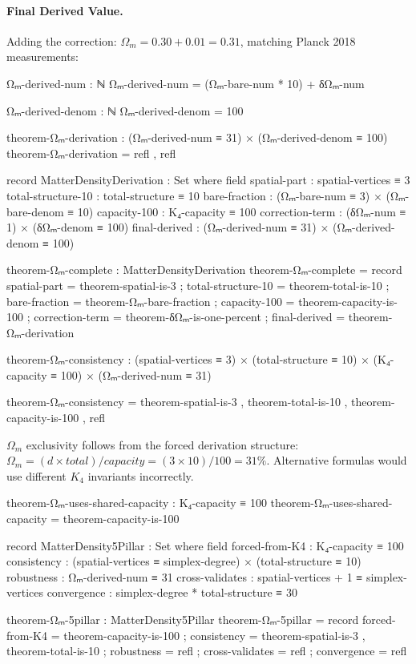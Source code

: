 \documentclass[11pt,a4paper]{book}
\def\text#1{#1}%
\begin{document}
\paragraph{Final Derived Value.}
Adding the correction: $\Omega_m = 0.30 + 0.01 = 0.31$, matching Planck 2018 measurements:

\begin{code}
Ωₘ-derived-num : ℕ
Ωₘ-derived-num = (Ωₘ-bare-num * 10) + δΩₘ-num

Ωₘ-derived-denom : ℕ
Ωₘ-derived-denom = 100

theorem-Ωₘ-derivation : (Ωₘ-derived-num ≡ 31) × (Ωₘ-derived-denom ≡ 100)
theorem-Ωₘ-derivation = refl , refl

record MatterDensityDerivation : Set where
  field
    spatial-part       : spatial-vertices ≡ 3
    total-structure-10 : total-structure ≡ 10
    bare-fraction      : (Ωₘ-bare-num ≡ 3) × (Ωₘ-bare-denom ≡ 10)
    capacity-100       : K₄-capacity ≡ 100
    correction-term    : (δΩₘ-num ≡ 1) × (δΩₘ-denom ≡ 100)
    final-derived      : (Ωₘ-derived-num ≡ 31) × (Ωₘ-derived-denom ≡ 100)

theorem-Ωₘ-complete : MatterDensityDerivation
theorem-Ωₘ-complete = record
  { spatial-part       = theorem-spatial-is-3
  ; total-structure-10 = theorem-total-is-10
  ; bare-fraction      = theorem-Ωₘ-bare-fraction
  ; capacity-100       = theorem-capacity-is-100
  ; correction-term    = theorem-δΩₘ-is-one-percent
  ; final-derived      = theorem-Ωₘ-derivation
  }
\end{code}

\begin{code}
theorem-Ωₘ-consistency : (spatial-vertices ≡ 3)
                       × (total-structure ≡ 10)
                       × (K₄-capacity ≡ 100)
                       × (Ωₘ-derived-num ≡ 31)

theorem-Ωₘ-consistency = theorem-spatial-is-3 
                       , theorem-total-is-10
                       , theorem-capacity-is-100
                       , refl
\end{code}

$\Omega_m$ exclusivity follows from the forced derivation structure:
$\Omega_m = (d \times \text{total}) / \text{capacity} = (3 \times 10) / 100 = 31\%$.
Alternative formulas would use different $K_4$ invariants incorrectly.

\begin{code}
theorem-Ωₘ-uses-shared-capacity : K₄-capacity ≡ 100
theorem-Ωₘ-uses-shared-capacity = theorem-capacity-is-100

record MatterDensity5Pillar : Set where
  field
    forced-from-K4  : K₄-capacity ≡ 100
    consistency     : (spatial-vertices ≡ simplex-degree) × (total-structure ≡ 10)
    robustness      : Ωₘ-derived-num ≡ 31
    cross-validates : spatial-vertices + 1 ≡ simplex-vertices
    convergence     : simplex-degree * total-structure ≡ 30

theorem-Ωₘ-5pillar : MatterDensity5Pillar
theorem-Ωₘ-5pillar = record
  { forced-from-K4  = theorem-capacity-is-100
  ; consistency     = theorem-spatial-is-3 , theorem-total-is-10
  ; robustness      = refl
  ; cross-validates = refl
  ; convergence     = refl
  }
\end{code}
\end{document}
